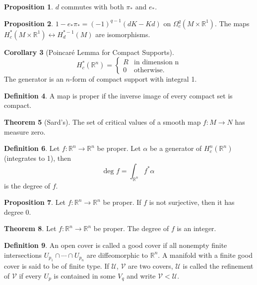 \documentclass[twocolumn]{article}
\theoremstyle{definition}
\newtheorem{definition}{Definition}[section]
\newtheorem{theorem}[definition]{Theorem}
\newtheorem{proposition}[definition]{Proposition}
\newtheorem{corollary}[definition]{Corollary}
\theoremstyle{remark}
\begin{document}
\begin{proposition}
    $d$ commutes with both $\pi_*$ and $e_*$.
\end{proposition}
\begin{proposition}
    $1 - e_* \pi_* = (-1)^{q-1}(dK - Kd)$ on $\Omega^q_c(M \times \mathbb{R}^1)$.
    The maps $H_c^*(M\times \mathbb{R}^1) \leftrightarrow H_d^{*-1}(M)$ are isomorphisms.
\end{proposition}
\begin{corollary}[Poincaré Lemma for Compact Supports]
    \begin{equation}
        H^*_c(\mathbb{R}^n) =
        \begin{cases}
            R & \textrm{in dimension n}\\
            0 & \textrm{otherwise.}
        \end{cases}
    \end{equation}
    The generator is an $n$-form of compact support with integral 1.
\end{corollary}
\begin{definition}
    A map is proper if the inverse image of every compact set is compact.
\end{definition}
\begin{theorem}[Sard's]
    The set of critical values of a smooth map $f: M \rightarrow N$ has measure zero.
\end{theorem}
\begin{definition}
    Let $f: \mathbb{R}^n \rightarrow \mathbb{R}^n$ be proper. Let $\alpha$ be a generator
    of $H^n_c(\mathbb{R}^n)$(integrates to 1), then
    \begin{equation}
        \textrm{deg }f = \int_{\mathbb{R}^n} f^*\alpha
    \end{equation}
    is the degree of $f$.
\end{definition}
\begin{proposition}
    Let $f: \mathbb{R}^n \rightarrow \mathbb{R}^n$ be proper. If $f$ is not surjective, then it has degree 0.
\end{proposition}
\begin{theorem}
    Let $f: \mathbb{R}^n \rightarrow \mathbb{R}^n$ be proper. The degree of $f$ is an integer.
\end{theorem}
\begin{definition}
    An open cover is called a good cover if all nonempty finite intersections
    $U_{p_1} \cap \cdots \cap U_{p_n}$ are diffeomorphic to $\mathbb{R}^n$. A manifold with a finite good cover is said to be of finite type.
    If $\mathcal{U}$, $\mathcal{V}$ are two covers, $\mathcal{U}$ is called the refinement of $\mathcal{V}$
    if every $U_p$ is contained in some $V_q$ and write $\mathcal{V} < \mathcal{U}$.
\end{definition}
\end{document}
